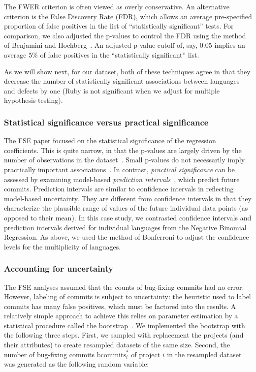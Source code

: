 \documentclass[acmsmall]{acmart}
\newcommand{\ruby}{{\sf  Ruby}\xspace}
\begin{document}
The FWER criterion is often viewed as overly conservative. An alternative
criterion is the False Discovery Rate (FDR), which allows an average
pre-specified proportion of false positives in the list of ``statistically
significant'' tests. For comparison, we also adjusted the p-values to control
the FDR using the method of Benjamini and Hochberg~\cite{fdr}.  An adjusted
p-value cutoff of, say, 0.05 implies an average 5\% of false positives in
the ``statistically significant'' list.

As we will show next, for our dataset, both of these techniques agree in
that they decrease the number of statistically significant associations
between languages and defects by one (\ruby is not significant when we
adjust for multiple hypothesis testing).



\subsubsection{Statistical significance versus practical significance}

The FSE paper focused on the statistical significance of the regression
coefficients.  This is quite narrow, in that the p-values are largely driven
by the number of observations in the dataset~\cite{halsey}. Small p-values
do not necessarily imply practically important
associations~\cite{lazar,misinterp}. In contrast, \emph{practical
  significance} can be assessed by examining model-based {\it prediction
  intervals}~\cite{knnl}, which predict future commits. Prediction intervals
are similar to confidence intervals in reflecting model-based
uncertainty. They are different from confidence intervals in that they
characterize the plausible range of values of the future individual data
points (as opposed to their mean). In this case study, we contrasted
confidence intervals and prediction intervals derived for individual
languages from the Negative Binomial Regression. As above, we used the
method of Bonferroni to adjust the confidence levels for the multiplicity of
languages.


\subsubsection{Accounting for uncertainty}

The FSE analyses assumed that the counts of bug-fixing commits had no
error. However, labeling of commits is subject to uncertainty: the heuristic
used to label commits has many false positives, which must be factored
into the results. A relatively simple approach to achieve this relies on
parameter estimation by a statistical procedure called the
bootstrap~\cite{knnl}. We implemented the bootstrap with the following three
steps. First, we sampled with replacement the projects (and their
attributes) to create resampled datasets of the same size. Second, the
number of bug-fixing commits $\mathrm{bcommits}^*_i$ of project $i$ in the
resampled dataset was generated as the following random variable:
\end{document}
